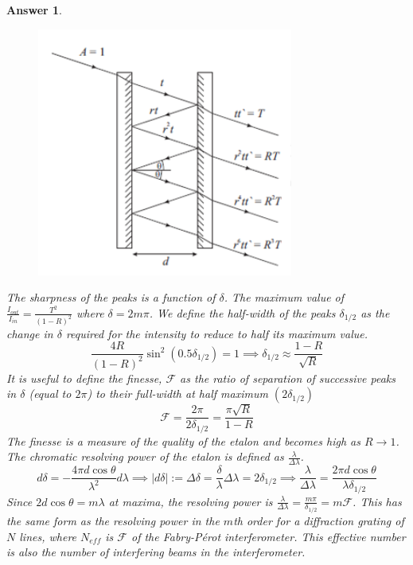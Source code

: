 \documentclass[a4paper]{article}
\newtheorem{ans}{Answer}[subsection]
\theoremstyle{new}
\begin{document}
\begin{ans}
\begin{figure}[H]
    \centering
    \includegraphics[scale=0.8]{2019P2B6.PNG}
\end{figure}
The sharpness of the peaks is a function of $\delta$. The maximum value of $\frac{I_{out}}{I_{in}}=\frac{T^2}{(1-R)^2}$ where $\delta=2m\pi$. We define the half-width of the peaks $\delta_{1/2}$ as the change in $\delta$ required for the intensity to reduce to half its maximum value.
$$\frac{4R}{(1-R)^2}\sin^2(0.5\delta_{1/2})=1\implies\delta_{1/2}\approx\frac{1-R}{\sqrt{R}}$$
It is useful to define the finesse, $\mathcal{F}$ as the ratio of separation of successive peaks in $\delta$ (equal to $2\pi$) to their full-width at half maximum $(2\delta_{1/2})$
$$\mathcal{F}=\frac{2\pi}{2\delta_{1/2}}=\frac{\pi\sqrt{R}}{1-R}$$
The finesse is a measure of the quality of the etalon and becomes high as $R\rightarrow 1$. The chromatic resolving power of the etalon is defined as $\frac{\lambda}{\Delta\lambda}$.
$$d\delta=-\frac{4\pi d\cos\theta}{\lambda^2}d\lambda\implies|d\delta|:=\Delta\delta=\frac{\delta}{\lambda}\Delta\lambda=2\delta_{1/2}\implies\frac{\lambda}{\Delta\lambda}=\frac{2\pi d\cos\theta}{\lambda\delta_{1/2}}$$
Since $2d\cos\theta=m\lambda$ at maxima, the resolving power is $\frac{\lambda}{\Delta\lambda}=\frac{m\pi}{\delta_{1/2}}=m\mathcal{F}$. This has the same form as the resolving power in the $m$th order for a diffraction grating of $N$ lines, where $N_{eff}$ is $\mathcal{F}$ of the Fabry-Pérot interferometer. This effective number is also the number of interfering beams in the interferometer.
\newpage

\end{ans}
\end{document}
